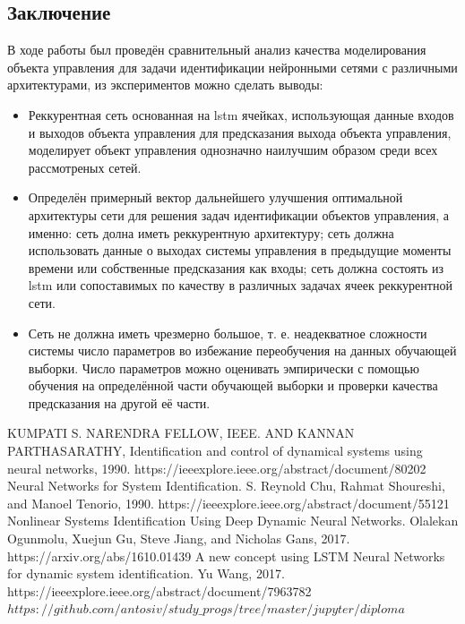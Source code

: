 \documentclass[12pt, oneside]{extbook}
\begin{document}
\begin{flushleft}
\chapter{Заключение}
\par
В ходе работы был проведён сравнительный анализ качества моделирования объекта управления для задачи идентификации нейронными сетями с различными архитектурами, из экспериментов можно сделать выводы:\\
\begin{itemize}
\item Реккурентная сеть основанная на lstm ячейках, использующая данные входов и выходов объекта управления для  предсказания выхода объекта управления, моделирует объект управления однозначно наилучшим образом среди всех рассмотреных сетей.
\item Определён примерный вектор дальнейшего улучшения оптимальной архитектуры сети для решения задач идентификации объектов управления, а именно: сеть долна иметь реккурентную архитектуру; сеть должна использовать данные о выходах системы управления в предыдущие моменты времени или собственные предсказания как входы; сеть должна состоять из lstm или сопоставимых по качеству в различных задачах ячеек реккурентной сети.
\item Сеть не должна иметь чрезмерно большое, т. е. неадекватное сложности системы число параметров во избежание переобучения на данных обучающей выборки. Число параметров можно оценивать эмпирически с помощью обучения на определённой части обучающей выборки и проверки качества предсказания на другой её части.
\end{itemize}
\begin{thebibliography}{1}
 KUMPATI S. NARENDRA FELLOW, IEEE. AND KANNAN  PARTHASARATHY, Identification and control of dynamical systems using neural networks, 1990. https://ieeexplore.ieee.org/abstract/document/80202
 Neural Networks for System Identification. S. Reynold Chu, Rahmat Shoureshi, and Manoel Tenorio, 1990. https://ieeexplore.ieee.org/abstract/document/55121
 Nonlinear Systems Identification Using Deep Dynamic Neural Networks. Olalekan Ogunmolu, Xuejun Gu, Steve Jiang, and Nicholas Gans, 2017. https://arxiv.org/abs/1610.01439
 A new concept using LSTM Neural Networks for dynamic system identification. Yu Wang, 2017. https://ieeexplore.ieee.org/abstract/document/7963782
 $https://github.com/antosiv/study\_progs/tree/master/jupyter/diploma$
\end{thebibliography}
\end{flushleft}
\end{document}

